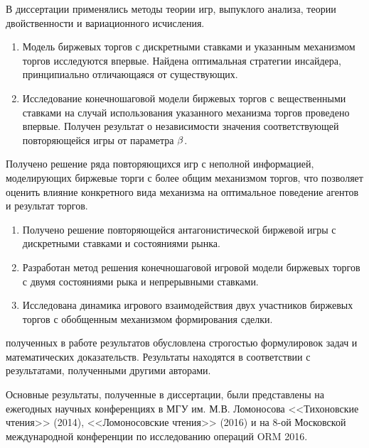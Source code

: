 {\methods} В диссертации применялись методы теории игр, выпуклого анализа, теории двойственности и вариационного исчисления.

{\novelty}
\begin{enumerate}
\item 
Модель биржевых торгов с дискретными ставками и указанным механизмом торгов исследуются впервые.
Найдена оптимальная стратегии инсайдера, принципиально отличающаяся от существующих.
\item 
Исследование конечношаговой модели биржевых торгов с вещественными ставками на случай использования указанного механизма торгов проведено впервые.
Получен результат о независимости значения соответствующей повторяющейся игры от параметра $\beta$.
\end{enumerate}

{\influence} Получено решение ряда повторяющихся игр с неполной информацией, моделирующих биржевые торги с более общим механизмом торгов, что позволяет оценить влияние конкретного вида механизма на оптимальное поведение агентов и результат торгов.

{}
\begin{enumerate}
\item
  Получено решение повторяющейся антагонистической биржевой игры с дискретными ставками и  состояниями рынка.
\item
  Разработан метод решения конечношаговой игровой модели биржевых торгов с двумя состояниями рыка и непрерывными ставками.
\item
  Исследована динамика игрового взаимодействия двух участников биржевых торгов с обобщенным механизмом формирования сделки.
\end{enumerate}

{\reliability} полученных в работе результатов обусловлена строгостью формулировок задач и математических доказательств.
Результаты находятся в соответствии с результатами, полученными другими авторами.

{\probation} Основные результаты, полученные в диссертации, были представлены на ежегодных научных конференциях в МГУ им. М.В. Ломоносова <<Тихоновские чтения>> (2014), <<Ломоносовские чтения>> (2016) и на 8-ой Московской международной конференции по исследованию операций ORM 2016.

